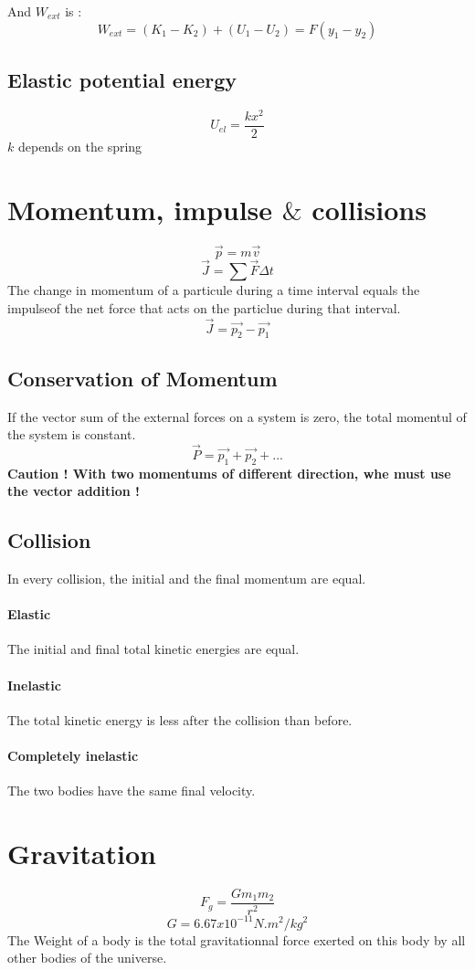 \documentclass[a4paper,10pt]{article}
\begin{document}
And $W_{ext}$ is :
\[W_{ext} = (K_1 - K_2) + (U_1 - U_2) = F(y_1 - y_2)\]

\subsection{Elastic potential energy}
\[U_{el} = \frac{kx^2}{2}\]
$k$ depends on the spring

\section{Momentum, impulse $\&$ collisions}
\[\vec{p} = m\vec{v}\]
\[\vec{J} = \sum{} \vec{F}\Delta t\]
The change in momentum of a particule during a time interval equals the impulseof the net force that acts on the particlue during that interval.
\[\vec{J} = \vec{p_2} - \vec{p_1}\]

\subsection{Conservation of Momentum}
If the vector sum of the external forces on a system is zero, the total momentul of the system is constant.
\[\vec{P} = \vec{p_1} + \vec{p_2} + ...\]
{ \bf Caution ! With two momentums of different direction, whe must use the vector addition !}

\subsection{Collision}
In every collision, the initial and the final momentum are equal.
\paragraph{Elastic} The initial and final total kinetic energies are equal.
\paragraph{Inelastic} The total kinetic energy is less after the collision than before.
\paragraph{Completely inelastic} The two bodies have the same final velocity.

\section{Gravitation}
\[F_g = \frac{Gm_1m_2}{r^2}\]
\[G = 6.67x10^{-11} N.m^2/kg^2\]
The Weight of a body is the total gravitationnal force exerted on this body by all other bodies of the universe.
\end{document}
